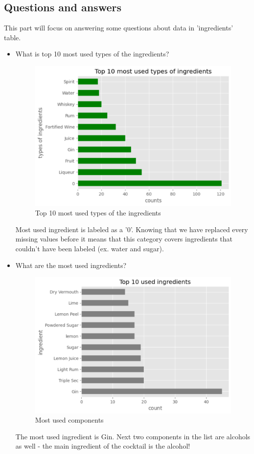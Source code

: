 \documentclass[a4paper]{article}
\begin{document}
\subsection{Questions and answers}
This part will focus on answering some questions about data in 'ingredients' table.
\begin{itemize}
    \item What is top 10 most used types of the ingredients?
    \begin{figure}[H]
        \centering
        \includegraphics[width=0.9\linewidth]{top10itypes.png}
        \caption{Top 10 most used types of the ingredients}
        \label{fig:enter-label}
    \end{figure}
    Most used ingredient is labeled as a '0'. Knowing that we have replaced every missing values before it means that this category covers ingredients that couldn't have been labeled (ex. water and sugar).

    \item What are the most used ingredients?
    \begin{figure}[H]
        \centering
        \includegraphics[width=0.9\linewidth]{most used ingr.png}
        \caption{Most used components}
        \label{fig:enter-label}
    \end{figure}
    The most used ingredient is Gin. Next two components in the list are alcohols as well - the main ingredient of the cocktail is the alcohol!


\end{itemize}
\end{document}
